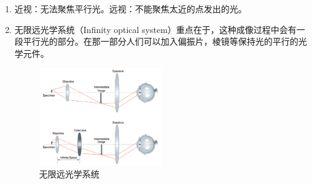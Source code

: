 \documentclass{ctexart}
\begin{document}
\begin{enumerate}
\item 近视：无法聚焦平行光。远视：不能聚焦太近的点发出的光。
\item 无限远光学系统（Infinity optical system）重点在于，这种成像过程中会有一段平行光的部分。在那一部分人们可以加入偏振片，棱镜等保持光的平行的光学元件。
\begin{figure}
\center
\includegraphics[width=0.5\textwidth]{无限光学系统.png}
\caption{无限远光学系统}
\end{figure}
\end{enumerate}
\end{document}
